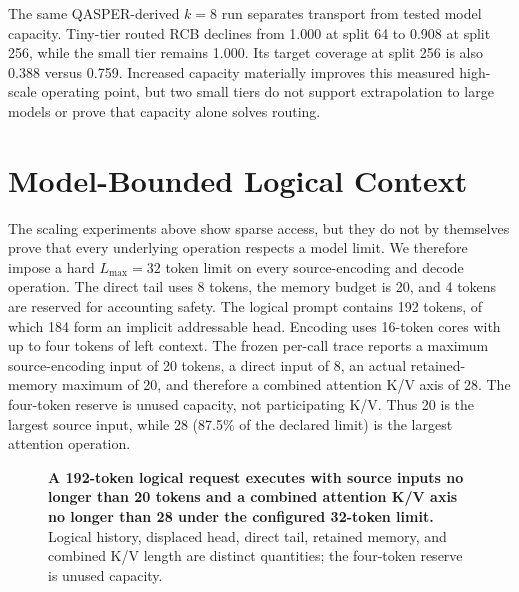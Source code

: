 \documentclass[11pt]{article}
\begin{document}
The same QASPER-derived $k=8$ run separates transport from tested model capacity.
Tiny-tier routed RCB declines from 1.000 at split 64 to 0.908 at split 256,
while the small tier remains 1.000. Its target coverage at split 256 is also 0.388
versus 0.759. Increased capacity materially improves this measured high-scale operating
point, but two small tiers do not support extrapolation to large models or prove that
capacity alone solves routing.

\section{Model-Bounded Logical Context}
\label{sec:bounded}

The scaling experiments above show sparse access,
but they do not by themselves prove that every underlying operation respects a model
limit. We therefore impose a hard $L_{\max}=32$ token limit on every source-encoding and
decode operation. The direct tail uses 8 tokens, the memory budget is 20,
and 4 tokens are reserved for accounting safety. The logical prompt contains 192 tokens,
of which 184 form an implicit addressable head. Encoding uses 16-token cores with up to
four tokens of left context. The frozen per-call trace reports a maximum source-encoding
input of 20 tokens, a direct input of 8, an actual retained-memory maximum of 20,
and therefore a combined attention K/V axis of 28.
The four-token reserve is unused capacity, not participating K/V.
Thus 20 is the largest source input, while 28 (87.5\% of the declared limit) is the
largest attention operation.

\begin{figure}[H]
\centering
{}
\caption{\textbf{A 192-token logical request executes with source inputs no longer than
20
tokens and a combined attention K/V axis no longer than 28 under the configured 32-token
limit.} Logical history, displaced head, direct tail, retained memory, and combined K/V
length are distinct quantities; the four-token reserve is unused capacity.}
\label{fig:bounded-head-path}
\end{figure}
\end{document}
